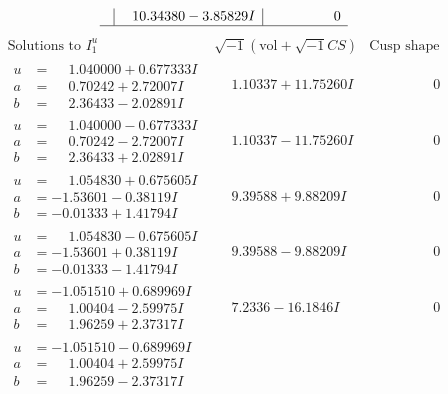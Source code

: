 \documentclass[1p]{elsarticle_modified}
\theoremstyle{definition}
\newcommand{\I}{\sqrt{-1}}
\begin{document}
$$\begin{array}{c|c|c}
 & \phantom{-}10.34380 - 3.85829 I & \phantom{-0.000000 } 0\\
 \hline 
 \end{array}$$\newpage$$\begin{array}{c|c|c}  
\text{Solutions to }I^u_{1}& \I (\text{vol} + \sqrt{-1}CS) & \text{Cusp shape}\\
 \hline 
\begin{aligned}
u &= \phantom{-}1.040000 + 0.677333 I \\
a &= \phantom{-}0.70242 + 2.72007 I \\
b &= \phantom{-}2.36433 - 2.02891 I\end{aligned}
 & \phantom{-}1.10337 + 11.75260 I & \phantom{-0.000000 } 0 \\ \hline\begin{aligned}
u &= \phantom{-}1.040000 - 0.677333 I \\
a &= \phantom{-}0.70242 - 2.72007 I \\
b &= \phantom{-}2.36433 + 2.02891 I\end{aligned}
 & \phantom{-}1.10337 - 11.75260 I & \phantom{-0.000000 } 0 \\ \hline\begin{aligned}
u &= \phantom{-}1.054830 + 0.675605 I \\
a &= -1.53601 - 0.38119 I \\
b &= -0.01333 + 1.41794 I\end{aligned}
 & \phantom{-}9.39588 + 9.88209 I & \phantom{-0.000000 } 0 \\ \hline\begin{aligned}
u &= \phantom{-}1.054830 - 0.675605 I \\
a &= -1.53601 + 0.38119 I \\
b &= -0.01333 - 1.41794 I\end{aligned}
 & \phantom{-}9.39588 - 9.88209 I & \phantom{-0.000000 } 0 \\ \hline\begin{aligned}
u &= -1.051510 + 0.689969 I \\
a &= \phantom{-}1.00404 - 2.59975 I \\
b &= \phantom{-}1.96259 + 2.37317 I\end{aligned}
 & \phantom{-}7.2336 - 16.1846 I & \phantom{-0.000000 } 0 \\ \hline\begin{aligned}
u &= -1.051510 - 0.689969 I \\
a &= \phantom{-}1.00404 + 2.59975 I \\
b &= \phantom{-}1.96259 - 2.37317 I\end{aligned}

\end{array}$$
\end{document}
